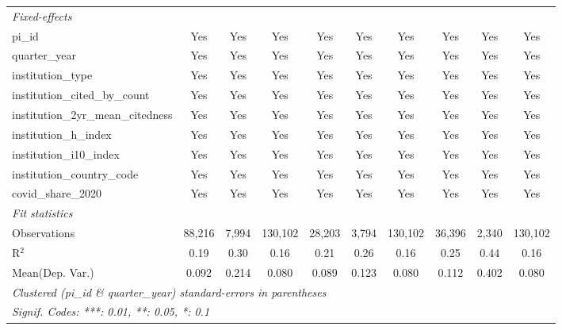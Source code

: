 \begin{tabular}{lccccccccc}
   \midrule
   \emph{Fixed-effects}\\
   pi\_id                                                      & Yes            & Yes            & Yes            & Yes            & Yes           & Yes            & Yes            & Yes            & Yes\\  
   quarter\_year                                               & Yes            & Yes            & Yes            & Yes            & Yes           & Yes            & Yes            & Yes            & Yes\\  
   institution\_type                                           & Yes            & Yes            & Yes            & Yes            & Yes           & Yes            & Yes            & Yes            & Yes\\  
   institution\_cited\_by\_count                               & Yes            & Yes            & Yes            & Yes            & Yes           & Yes            & Yes            & Yes            & Yes\\  
   institution\_2yr\_mean\_citedness                           & Yes            & Yes            & Yes            & Yes            & Yes           & Yes            & Yes            & Yes            & Yes\\  
   institution\_h\_index                                       & Yes            & Yes            & Yes            & Yes            & Yes           & Yes            & Yes            & Yes            & Yes\\  
   institution\_i10\_index                                     & Yes            & Yes            & Yes            & Yes            & Yes           & Yes            & Yes            & Yes            & Yes\\  
   institution\_country\_code                                  & Yes            & Yes            & Yes            & Yes            & Yes           & Yes            & Yes            & Yes            & Yes\\  
   covid\_share\_2020                                          & Yes            & Yes            & Yes            & Yes            & Yes           & Yes            & Yes            & Yes            & Yes\\  
   \midrule
   \emph{Fit statistics}\\
   Observations                                                & 88,216         & 7,994          & 130,102        & 28,203         & 3,794         & 130,102        & 36,396         & 2,340          & 130,102\\  
   R$^2$                                                       & 0.19           & 0.30           & 0.16           & 0.21           & 0.26          & 0.16           & 0.25           & 0.44           & 0.16\\  
Mean(Dep. Var.) & 0.092 & 0.214 & 0.080 & 0.089 & 0.123 & 0.080 & 0.112 & 0.402 & 0.080 \\
   \midrule \midrule
   \multicolumn{10}{l}{\emph{Clustered (pi\_id \& quarter\_year) standard-errors in parentheses}}\\
   \multicolumn{10}{l}{\emph{Signif. Codes: ***: 0.01, **: 0.05, *: 0.1}}\\
\end{tabular}
\par\endgroup
